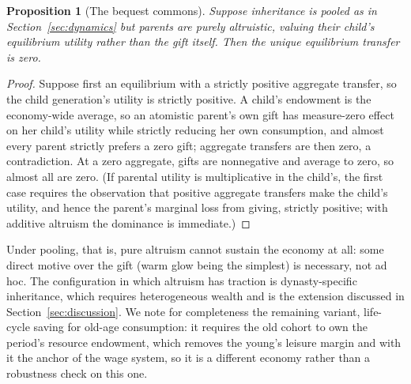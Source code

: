 \documentclass[12pt,letterpaper]{article}
\newtheorem{proposition}{Proposition}
\theoremstyle{definition}
\begin{document}
\begin{proposition}[The bequest commons]\label{prop:commons}
Suppose inheritance is pooled as in Section~\ref{sec:dynamics} but parents are purely altruistic, valuing their child's equilibrium utility rather than the gift itself.
Then the unique equilibrium transfer is zero.
\end{proposition}

\begin{proof}
Suppose first an equilibrium with a strictly positive aggregate transfer, so the child generation's utility is strictly positive.
A child's endowment is the economy-wide average, so an atomistic parent's own gift has measure-zero effect on her child's utility while strictly reducing her own consumption, and almost every parent strictly prefers a zero gift; aggregate transfers are then zero, a contradiction.
At a zero aggregate, gifts are nonnegative and average to zero, so almost all are zero.
(If parental utility is multiplicative in the child's, the first case requires the observation that positive aggregate transfers make the child's utility, and hence the parent's marginal loss from giving, strictly positive; with additive altruism the dominance is immediate.)
\end{proof}

Under pooling, that is, pure altruism cannot sustain the economy at all: some direct motive over the gift (warm glow being the simplest) is necessary, not ad hoc.
The configuration in which altruism has traction is dynasty-specific inheritance, which requires heterogeneous wealth and is the extension discussed in Section~\ref{sec:discussion}.
We note for completeness the remaining variant, life-cycle saving for old-age consumption: it requires the old cohort to own the period's resource endowment, which removes the young's leisure margin and with it the anchor of the wage system, so it is a different economy rather than a robustness check on this one.



\end{document}

